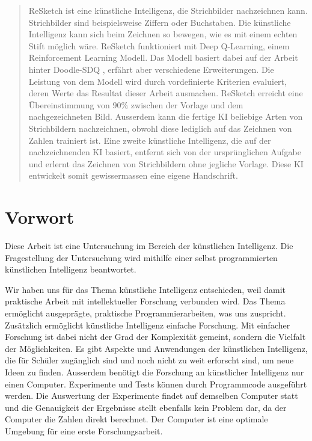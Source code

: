 \begin{abstract}\label{abstract} ReSketch ist eine künstliche Intelligenz, die
Strichbilder nachzeichnen kann. Strichbilder sind beispielsweise Ziffern oder
Buchstaben. Die künstliche Intelligenz kann sich beim Zeichnen so bewegen, wie
es mit einem echten Stift möglich wäre. ReSketch funktioniert mit Deep
Q-Learning, einem Reinforcement Learning Modell. Das Modell basiert dabei auf
der Arbeit hinter Doodle-SDQ \cite{zhou_learning_2018}, erfährt aber
verschiedene Erweiterungen. Die Leistung von dem Modell wird durch vordefinierte
Kriterien evaluiert, deren Werte das Resultat dieser Arbeit ausmachen. ReSketch
erreicht eine Übereinstimmung von $90\%$ zwischen der Vorlage und dem
nachgezeichneten Bild. Ausserdem kann die fertige KI beliebige Arten von
Strichbildern nachzeichnen, obwohl diese lediglich auf das Zeichnen von Zahlen
trainiert ist. Eine zweite künstliche Intelligenz, die auf der nachzeichnenden
KI basiert, entfernt sich von der ursprünglichen Aufgabe und erlernt das
Zeichnen von Strichbildern ohne jegliche Vorlage. Diese KI entwickelt somit
gewissermassen eine eigene Handschrift.
\end{abstract}

    
\newpage
    
\section*{Vorwort}\label{vorwort} Diese Arbeit ist eine Untersuchung im Bereich
der künstlichen Intelligenz. Die Fragestellung der Untersuchung wird mithilfe
einer selbst programmierten künstlichen Intelligenz beantwortet.
    
Wir haben uns für das Thema künstliche Intelligenz entschieden, weil damit
praktische Arbeit mit intellektueller Forschung verbunden wird. Das Thema
ermöglicht ausgeprägte, praktische Programmierarbeiten, was uns zuspricht.
Zusätzlich ermöglicht künstliche Intelligenz einfache Forschung. Mit einfacher
Forschung ist dabei nicht der Grad der Komplexität gemeint, sondern die Vielfalt
der Möglichkeiten. Es gibt Aspekte und Anwendungen der künstlichen Intelligenz,
die für Schüler zugänglich sind und noch nicht zu weit erforscht sind, um neue
Ideen zu finden. Ausserdem benötigt die Forschung an künstlicher Intelligenz nur
einen Computer. Experimente und Tests können durch Programmcode ausgeführt
werden. Die Auswertung der Experimente findet auf demselben Computer statt und
die Genauigkeit der Ergebnisse stellt ebenfalls kein Problem dar, da der
Computer die Zahlen direkt berechnet. Der Computer ist eine optimale Umgebung
für eine erste Forschungsarbeit.
    

